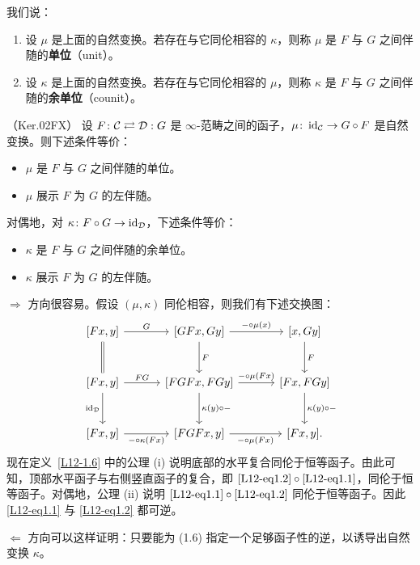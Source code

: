 \begin{definition}\label{L12-1.8}
我们说：
\begin{enumerate}[label=(\arabic*),leftmargin=2.4em,itemsep=0.2em]
\item 设 $\mu$ 是上面的自然变换。若存在与它同伦相容的 $\kappa$，则称 $\mu$ 是 $F$ 与 $G$ 之间伴随的\textbf{单位}（unit）。
\item 设 $\kappa$ 是上面的自然变换。若存在与它同伦相容的 $\mu$，则称 $\kappa$ 是 $F$ 与 $G$ 之间伴随的\textbf{余单位}（counit）。
\end{enumerate}
\end{definition}

\begin{proposition}\label{L12-1.9}（Ker.02FX）
设 $F\colon\mathcal{C}\rightleftarrows\mathcal{D}:G$ 是 $\infty$-范畴之间的函子，$\mu\colon\operatorname{id}_{\mathcal{C}}\to G\circ F$ 是自然变换。则下述条件等价：
\begin{itemize}[leftmargin=2.2em,itemsep=0.1em]
\item $\mu$ 是 $F$ 与 $G$ 之间伴随的单位。
\item $\mu$ 展示 $F$ 为 $G$ 的左伴随。
\end{itemize}
对偶地，对 $\kappa\colon F\circ G\to\operatorname{id}_{\mathcal{D}}$，下述条件等价：
\begin{itemize}[leftmargin=2.2em,itemsep=0.1em]
\item $\kappa$ 是 $F$ 与 $G$ 之间伴随的余单位。
\item $\kappa$ 展示 $F$ 为 $G$ 的左伴随。
\end{itemize}
\end{proposition}

\begin{remark}\label{L12-1.10}
$\Rightarrow$ 方向很容易。假设 $(\mu,\kappa)$ 同伦相容，则我们有下述交换图：
\[
\begin{tikzcd}[column sep=3.2em,row sep=2.8em]
{[Fx,y]} \arrow[r,"G"] \arrow[d,equal] & {[GFx,Gy]} \arrow[r,"-\circ\mu(x)"] \arrow[d,"F"] & {[x,Gy]} \arrow[d,"F"] \\
{[Fx,y]} \arrow[r,"FG"] \arrow[d,"\id_{\cD}"'] & {[FGFx,FGy]} \arrow[r,"-\circ\mu(Fx)"] \arrow[d,"\kappa(y)\circ-"] & {[Fx,FGy]} \arrow[d,"\kappa(y)\circ-"] \\
{[Fx,y]} \arrow[r,"-\circ\kappa(Fx)"'] & {[FGFx,y]} \arrow[r,"-\circ\mu(Fx)"'] & {[Fx,y].}
\end{tikzcd}
\]
现在定义~\ref{L12-1.6} 中的公理 (i) 说明底部的水平复合同伦于恒等函子。由此可知，顶部水平函子与右侧竖直函子的复合，即 $\eqref{L12-eq1.2}\circ\eqref{L12-eq1.1}$，同伦于恒等函子。对偶地，公理 (ii) 说明 $\eqref{L12-eq1.1}\circ\eqref{L12-eq1.2}$ 同伦于恒等函子。因此 \eqref{L12-eq1.1} 与 \eqref{L12-eq1.2} 都可逆。

$\Leftarrow$ 方向可以这样证明：只要能为 (1.6) 指定一个足够函子性的逆，以诱导出自然变换 $\kappa$。
\end{remark}

